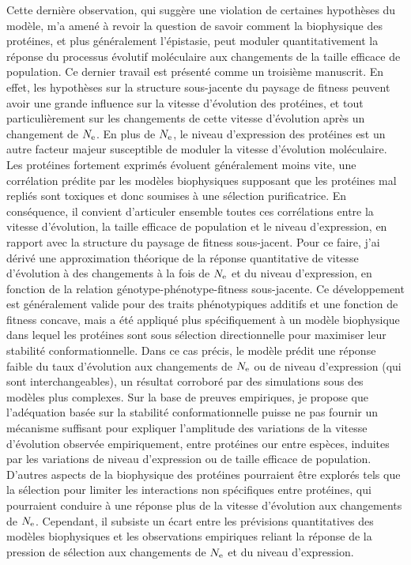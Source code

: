Cette dernière observation, qui suggère une violation de certaines hypothèses du modèle, m'a amené à revoir la question de savoir comment la biophysique des protéines, et plus généralement l'épistasie, peut moduler quantitativement la réponse du processus évolutif moléculaire aux changements de la taille efficace de population.
Ce dernier travail est présenté comme un troisième manuscrit.
En effet, les hypothèses sur la structure sous-jacente du paysage de fitness peuvent avoir une grande influence sur la vitesse d'évolution des protéines, et tout particulièrement sur les changements de cette vitesse d'évolution après un changement de $N_{\textrm{e}}$.
En plus de $N_{\textrm{e}}$, le niveau d'expression des protéines est un autre facteur majeur susceptible de moduler la vitesse d'évolution moléculaire.
Les protéines fortement exprimés évoluent généralement moins vite, une corrélation prédite par les modèles biophysiques supposant que les protéines mal repliés sont toxiques et donc soumises à une sélection purificatrice.
En conséquence, il convient d'articuler ensemble toutes ces corrélations entre la vitesse d'évolution, la taille efficace de population et le niveau d'expression, en rapport avec la structure du paysage de fitness sous-jacent.
Pour ce faire, j'ai dérivé une approximation théorique de la réponse quantitative de vitesse d'évolution à des changements à la fois de $N_{\textrm{e}}$ et du niveau d'expression, en fonction de la relation génotype-phénotype-fitness sous-jacente.
Ce développement est généralement valide pour des traits phénotypiques additifs et une fonction de fitness concave, mais a été appliqué plus spécifiquement à un modèle biophysique dans lequel les protéines sont sous sélection directionnelle pour maximiser leur stabilité conformationnelle.
Dans ce cas précis, le modèle prédit une réponse faible du taux d'évolution aux changements de $N_{\textrm{e}}$ ou de niveau d'expression (qui sont interchangeables), un résultat corroboré par des simulations sous des modèles plus complexes.
Sur la base de preuves empiriques, je propose que l'adéquation basée sur la stabilité conformationnelle puisse ne pas fournir un mécanisme suffisant pour expliquer l'amplitude des variations de la vitesse d'évolution observée empiriquement, entre protéines our entre espèces, induites par les variations de niveau d'expression ou de taille efficace de population.
D'autres aspects de la biophysique des protéines pourraient être explorés tels que la sélection pour limiter les interactions non spécifiques entre protéines, qui pourraient conduire à une réponse plus de la vitesse d'évolution aux changements de $N_{\textrm{e}}$.
Cependant, il subsiste un écart entre les prévisions quantitatives des modèles biophysiques et les observations empiriques reliant la réponse de la pression de sélection aux changements de $N_{\textrm{e}}$ et du niveau d'expression.

